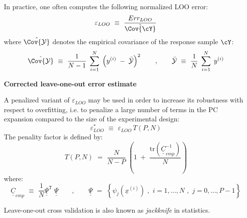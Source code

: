 {  In practice, one often computes the following normalized LOO error:
  \begin{equation} \label{eq:4.3:8bis}
    \varepsilon_{LOO} \, \, \equiv \, \, \frac{Err_{LOO}}{\hat{\Cov{\cY}}}
  \end{equation}
  where $\hat{\Cov{\mathcal{Y}}}$ denotes the empirical covariance of the response sample $\cY$:
  \begin{equation} \label{eq:4.3:4bis}
    \hat{\Cov{\mathcal{Y}}} \, \, \equiv \, \, \frac{1}{N-1} \; \sum_{i=1}^{N} \; \left( y^{(i)} \; - \;   \bar{\mathcal{Y}}  \right)^{2} \quad  \quad , \quad \quad   \bar{\mathcal{Y}} \, \, \equiv \, \, \frac{1}{N} \; \sum_{i=1}^{N} \; y^{(i)}
  \end{equation}

  \textbf{Corrected leave-one-out error estimate} \vspace{2mm}

  A penalized variant of $\varepsilon_{LOO}$ may be used in order to increase its robustness with respect to overfitting, i.e. to penalize a large number of terms in the PC expansion compared to the size of the experimental design:
  \begin{equation}
    \varepsilon_{LOO}^{*} \, \, \equiv \, \, \varepsilon_{LOO} \, T(P,N)
  \end{equation}
  The penality factor is defined by:
  \begin{equation}
    T(P,N) \, \, = \, \,   \frac{N}{N-P}  \; \left(1 \; + \; \frac{\mbox{tr} \left( \underline{\underline{C}}_{emp}^{-1}  \right) }{N} \right)
  \end{equation}
  where:
  \begin{equation} \label{eq:4.3:10bis}
    \underline{\underline{C}}_{emp} \, \, \equiv \, \, \frac{1}{N}\underline{\underline{\Psi}}^{\textsf{T}}\; \underline{\underline{\Psi}} \quad \quad , \quad \quad
    \underline{\underline{\Psi}} \, \, = \, \, \left\{ \psi_{j}(\underline{x}^{(i)}) \, \, , \, \, i=1,\dots,N \, \, , \, \, j=0,\dots,P-1 \right\}
  \end{equation}
}
{Leave-one-out cross validation is also known as \emph{jackknife} in statistics.}

